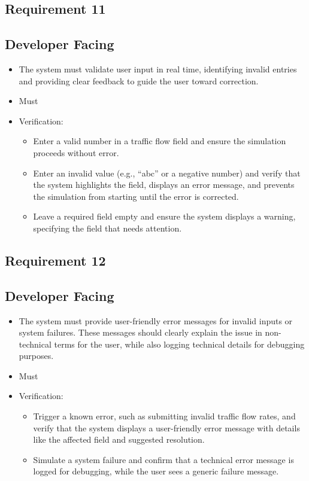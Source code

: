 \documentclass{article}
\begin{document}
\subsection{Requirement 11}
\subsection{Developer Facing}
\begin{itemize}
  \item The system must validate user input in real time, identifying invalid entries and providing clear feedback to guide the user toward correction.
  \item Must
  \item Verification:
  \begin{itemize}
      \item Enter a valid number in a traffic flow field and ensure the simulation proceeds without error.
      \item Enter an invalid value (e.g., “abc” or a negative number) and verify that the system highlights the field, displays an error message, and prevents the 
      simulation from starting until the error is corrected.
      \item Leave a required field empty and ensure the system displays a warning, specifying the field that needs attention.
  \end{itemize}
\end{itemize}

\subsection{Requirement 12}
\subsection{Developer Facing}
\begin{itemize}
  \item The system must provide user-friendly error messages for invalid inputs or system failures. These messages should clearly explain the issue in
  non-technical terms for the user, while also logging technical details for debugging purposes.
  \item Must
  \item Verification: 
  \begin{itemize}
      \item Trigger a known error, such as submitting invalid traffic flow rates, and verify that the system displays a user-friendly error message with
      details like the affected field and suggested resolution.
      \item Simulate a system failure and confirm that a technical error message is logged for debugging, while the user sees a generic failure message.
  \end{itemize}
\end{itemize}
\end{document}
